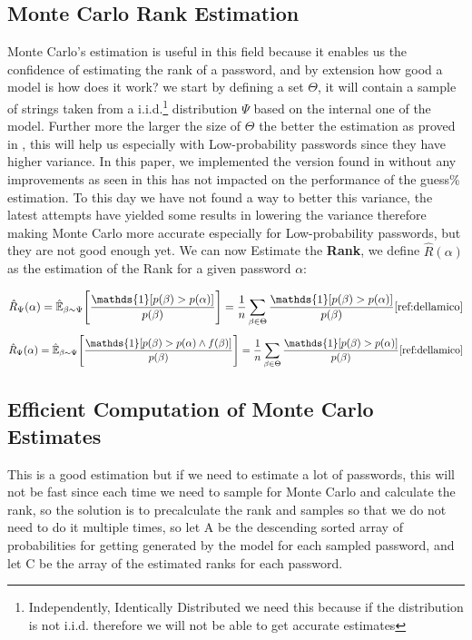 \documentclass[english,noexaminfo,a4paper,oneside, binding = 0.6cm]{sapthesis}
\begin{document}
\subsection{Monte Carlo Rank Estimation}
Monte Carlo's estimation is useful in this field \cite{ref:dellamico} because it enables us the confidence of estimating the rank of a password, and by extension how good a model is how does it work? 
we start by defining a set $\Theta$, it will contain a sample of strings taken from a i.i.d.\footnote{Independently, Identically Distributed we need this because if the distribution is not i.i.d. therefore we will not be able to get accurate estimates} distribution $\Psi$ based on the internal one of the model.
Further more the larger the size of $\Theta$ the better the estimation as proved in \cite{ref:dellamico}, this will help us especially with Low-probability passwords since they have higher variance. 
In this paper, we implemented the version found in \cite{ref:dellamico} without any improvements as seen in \cite{ref:stanek} this has not impacted on the performance of the guess\% estimation.
To this day we have not found a way to better this variance, the latest attempts have yielded some results in lowering the variance therefore making Monte Carlo more accurate especially for Low-probability passwords, but they are not good enough yet.
We can now Estimate the \textbf{Rank}, we define $\hat{R}(\alpha)$ as the estimation of the Rank for a given password $\alpha$:

\begin{equation}
\hat{R}_\Psi(\alpha) = \hat{\mathbb{E}}_{\beta\sim \Psi}\Bigg[\frac{  \mathds{1} [p(\beta) > p(\alpha)]}{p(\beta)}\Bigg] = \frac{1}{n}\sum_{\beta \in \Theta }\frac{ \mathds{1}[p(\beta) > p(\alpha)]}{p(\beta)} \cite{ref:dellamico}
\label{eq:estimaterank}
\end{equation}
\begin{equation}
  \hat{R}_\Psi(\alpha) = \hat{\mathbb{E}}_{\beta\sim \Psi}\Bigg[\frac{  \mathds{1} [p(\beta) > p(\alpha) \wedge f(\beta) ]}{p(\beta)}\Bigg] = \frac{1}{n}\sum_{\beta \in \Theta }\frac{ \mathds{1}[p(\beta) > p(\alpha)]}{p(\beta)} \cite{ref:dellamico}
\label{eq:estimatefilteredrank}
\end{equation}

\subsection{Efficient Computation of Monte Carlo Estimates}
This is a good estimation but if we need to estimate a lot of passwords, this will not be fast since each time we need to sample for Monte Carlo and calculate the rank, so the solution is to precalculate the rank and samples so that we do not need to do it multiple times,
so let A be the descending sorted array of probabilities for getting generated by the model for each sampled password, 
and let C be the array of  the estimated ranks for each password.
\end{document}

